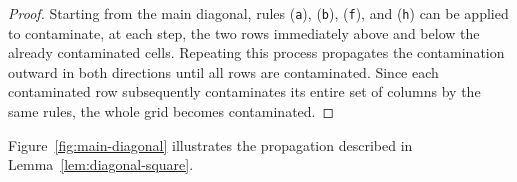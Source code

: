 \documentclass[letterpaper,12pt]{article}
\begin{document}
\begin{proof}
Starting from the main diagonal, rules \textup{(\texttt{a})}, \textup{(\texttt{b})}, \textup{(\texttt{f})}, and \textup{(\texttt{h})} can be applied to contaminate, at each step, the two rows immediately above and below the already contaminated cells. Repeating this process propagates the contamination outward in both directions until all rows are contaminated. Since each contaminated row subsequently contaminates its entire set of columns by the same rules, the whole grid becomes contaminated. \qedhere 
\end{proof}
Figure~\ref{fig:main-diagonal} illustrates the propagation described in Lemma~\ref{lem:diagonal-square}.
\begin{figure}[H]
    \centering




\begin{tikzpicture}[scale=0.8pt,x=0.75pt,y=0.75pt,yscale=-1,xscale=1]


\end{tikzpicture}
\end{figure}
\end{document}
